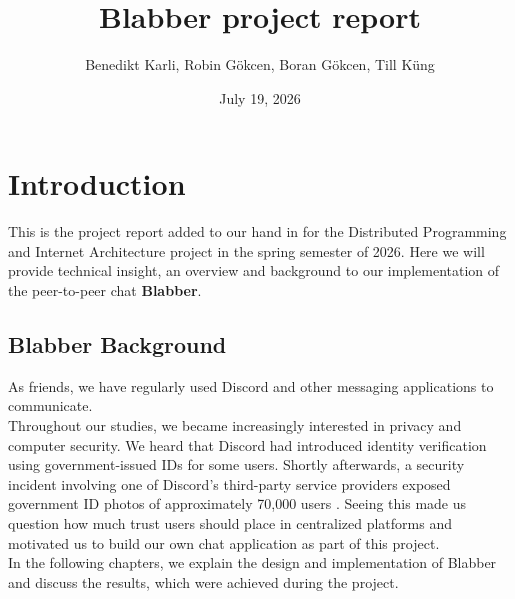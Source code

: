 \documentclass{article} %
\title{Blabber project report}
\author{Benedikt Karli, Robin Gökcen, Boran Gökcen, Till Küng}
\date{July 19, 2026}
\begin{document}
\maketitle

\section{Introduction}
This is the project report added to our hand in for the Distributed Programming and Internet Architecture project in the spring semester of 2026. Here we will provide technical insight, an overview and background to our implementation of the peer-to-peer chat \textbf{Blabber}.
\subsection{Blabber Background}
As friends, we have regularly used Discord and other messaging applications to communicate.
\\
Throughout our studies, we became increasingly interested in privacy and computer security. We heard that Discord had introduced identity verification using government-issued IDs for some users. Shortly afterwards, a security incident involving one of Discord's third-party service providers exposed government ID photos of approximately 70,000 users \cite{discordbreach}. Seeing this made us question how much trust users should place in centralized platforms and motivated us to build our own chat application as part of this project.
\\
In the following chapters, we explain the design and implementation of Blabber and discuss the results, which were achieved during the project.
\end{document}
